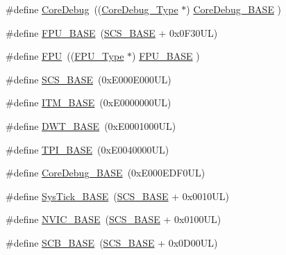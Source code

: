 \begin{DoxyCompactItemize}
\item 
\#define \hyperlink{group___c_m_s_i_s__core__base_gab6e30a2b802d9021619dbb0be7f5d63d}{Core\+Debug}~((\hyperlink{struct_core_debug___type}{Core\+Debug\+\_\+\+Type} $\ast$)     \hyperlink{group___c_m_s_i_s__core__base_ga680604dbcda9e9b31a1639fcffe5230b}{Core\+Debug\+\_\+\+B\+A\+SE}   )
\item 
\#define \hyperlink{group___c_m_s_i_s__core__base_ga4dcad4027118c098c07bcd575f1fbb28}{F\+P\+U\+\_\+\+B\+A\+SE}~(\hyperlink{group___c_m_s_i_s__core__base_ga3c14ed93192c8d9143322bbf77ebf770}{S\+C\+S\+\_\+\+B\+A\+SE} +  0x0\+F30\+U\+L)
\item 
\#define \hyperlink{group___c_m_s_i_s__core__base_gabc7c93f2594e85ece1e1a24f10591428}{F\+PU}~((\hyperlink{struct_f_p_u___type}{F\+P\+U\+\_\+\+Type}       $\ast$)     \hyperlink{group___c_m_s_i_s__core__base_ga4dcad4027118c098c07bcd575f1fbb28}{F\+P\+U\+\_\+\+B\+A\+SE}         )
\item 
\#define \hyperlink{group___c_m_s_i_s__core__base_ga3c14ed93192c8d9143322bbf77ebf770}{S\+C\+S\+\_\+\+B\+A\+SE}~(0x\+E000\+E000\+U\+L)
\item 
\#define \hyperlink{group___c_m_s_i_s__core__base_gadd76251e412a195ec0a8f47227a8359e}{I\+T\+M\+\_\+\+B\+A\+SE}~(0x\+E0000000\+U\+L)
\item 
\#define \hyperlink{group___c_m_s_i_s__core__base_gafdab534f961bf8935eb456cb7700dcd2}{D\+W\+T\+\_\+\+B\+A\+SE}~(0x\+E0001000\+U\+L)
\item 
\#define \hyperlink{group___c_m_s_i_s__core__base_ga2b1eeff850a7e418844ca847145a1a68}{T\+P\+I\+\_\+\+B\+A\+SE}~(0x\+E0040000\+U\+L)
\item 
\#define \hyperlink{group___c_m_s_i_s__core__base_ga680604dbcda9e9b31a1639fcffe5230b}{Core\+Debug\+\_\+\+B\+A\+SE}~(0x\+E000\+E\+D\+F0\+U\+L)
\item 
\#define \hyperlink{group___c_m_s_i_s__core__base_ga58effaac0b93006b756d33209e814646}{Sys\+Tick\+\_\+\+B\+A\+SE}~(\hyperlink{group___c_m_s_i_s__core__base_ga3c14ed93192c8d9143322bbf77ebf770}{S\+C\+S\+\_\+\+B\+A\+SE} +  0x0010\+U\+L)
\item 
\#define \hyperlink{group___c_m_s_i_s__core__base_gaa0288691785a5f868238e0468b39523d}{N\+V\+I\+C\+\_\+\+B\+A\+SE}~(\hyperlink{group___c_m_s_i_s__core__base_ga3c14ed93192c8d9143322bbf77ebf770}{S\+C\+S\+\_\+\+B\+A\+SE} +  0x0100\+U\+L)
\item 
\#define \hyperlink{group___c_m_s_i_s__core__base_gad55a7ddb8d4b2398b0c1cfec76c0d9fd}{S\+C\+B\+\_\+\+B\+A\+SE}~(\hyperlink{group___c_m_s_i_s__core__base_ga3c14ed93192c8d9143322bbf77ebf770}{S\+C\+S\+\_\+\+B\+A\+SE} +  0x0\+D00\+U\+L)

\end{DoxyCompactItemize}

